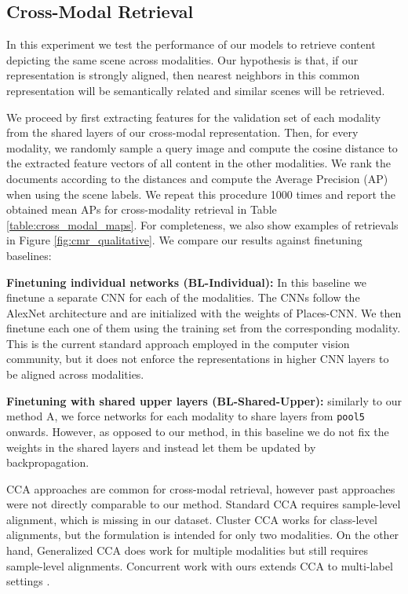 \documentclass[10pt,journal,compsoc]{IEEEtran}
\begin{document}
	\subsection{Cross-Modal Retrieval}
	In this experiment we test the performance of our models to retrieve content depicting the same scene across modalities. Our hypothesis is that, if our representation is strongly aligned, then nearest neighbors in this common representation will be semantically related and similar scenes will be retrieved.
	
	We proceed by first extracting features for the validation set of each modality from the shared layers of our cross-modal representation. Then, for every modality, we randomly sample a query image and compute the cosine distance to the extracted feature vectors of all content in the other modalities. We rank the documents according to the distances and compute the Average Precision (AP) when using the scene labels. We repeat this procedure 1000 times and report the obtained mean APs for cross-modality retrieval in Table \ref{table:cross_modal_maps}. For completeness, we also show examples of retrievals in Figure \ref{fig:cmr_qualitative}. We compare our results against finetuning baselines:
	
	\textbf{Finetuning individual networks (BL-Individual):} In this baseline we finetune a separate CNN for each of the modalities. The CNNs follow the AlexNet \cite{krizhevsky2012imagenet} architecture and are initialized with the weights of Places-CNN. We then finetune each one of them using the training set from the corresponding modality. This is the current standard approach employed in the computer vision community, but it does not enforce the representations in higher CNN layers to be aligned across modalities. 
	
	\textbf{Finetuning with shared upper layers (BL-Shared-Upper):} similarly to our method A, we force networks for each modality to share layers from \texttt{pool5} onwards. However, as opposed to our method, in this baseline we do not fix the weights in the shared layers and instead let them be updated by backpropagation.
	
	
	CCA approaches are common for cross-modal retrieval, however past approaches were not directly comparable to our method. Standard CCA requires sample-level alignment, which is missing in our dataset. Cluster CCA \cite{rasiwasia2014cluster} works for class-level alignments, but the formulation is intended for only two modalities. On the other hand, Generalized CCA \cite{hardoon2004canonical} does work for multiple modalities but still requires sample-level alignments. Concurrent work with ours extends CCA to multi-label settings \cite{ranjan2015multi}.
	
\end{document}
